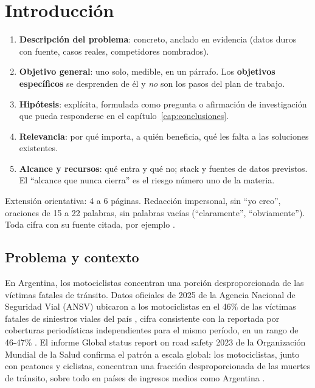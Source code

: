 
\chapter{Introducción}\label{cap:introduccion}

\begin{guia}
\begin{enumerate}
    \item \textbf{Descripción del problema}: concreto, anclado en evidencia
          (datos duros con fuente, casos reales, competidores nombrados).
    \item \textbf{Objetivo general}: uno solo, medible, en un párrafo.
          Los \textbf{objetivos específicos} se desprenden de él y
          \emph{no} son los pasos del plan de trabajo.
    \item \textbf{Hipótesis}: explícita, formulada como pregunta o
          afirmación de investigación que pueda responderse en el
          capítulo~\ref{cap:conclusiones}.
    \item \textbf{Relevancia}: por qué importa, a quién beneficia, qué les
          falta a las soluciones existentes.
    \item \textbf{Alcance y recursos}: qué entra y qué no; stack y fuentes
          de datos previstos. El ``alcance que nunca cierra'' es el riesgo
          número uno de la materia.
\end{enumerate}
Extensión orientativa: 4 a 6 páginas. Redacción impersonal, sin ``yo
creo'', oraciones de 15 a 22 palabras, sin palabras vacías
(``claramente'', ``obviamente''). Toda cifra con su fuente citada, por
ejemplo \citep{breiman2001}.
\end{guia}

\section{Problema y contexto}

En Argentina, los motociclistas concentran una porción desproporcionada
de las víctimas fatales de tránsito. Datos oficiales de 2025 de la
Agencia Nacional de Seguridad Vial (ANSV) ubicaron a los motociclistas
en el 46\% de las víctimas fatales de siniestros viales del país
\citep{infoecos2026}, cifra consistente con la reportada
por coberturas periodísticas independientes para el mismo período, en un
rango de 46-47\% \citep{lanacion2025,datoposta2025}. El informe Global
status report on road safety 2023 de la Organización Mundial de la Salud
confirma el patrón a escala global: los motociclistas, junto con
peatones y ciclistas, concentran una fracción desproporcionada de las
muertes de tránsito, sobre todo en países de ingresos medios como
Argentina \citep{who2023}.

